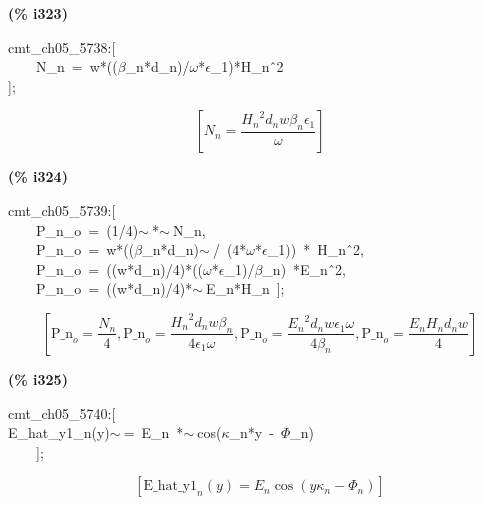 \documentclass[fleqn]{article}
\begin{document}
\noindent
\begin{minipage}[t]{4.000000em}\color{red}\bfseries
(\% i323)	
\end{minipage}
\begin{minipage}[t]{\textwidth}\color{blue}
cmt\_ch05\_5738:[\\
\ \ \ \ N\_n\ =\ w*((\ensuremath{\beta}\_n*d\_n)/\ensuremath{\omega}*\ensuremath{\epsilon}\_1)*H\_n\^\ 2\\
];
\end{minipage}
\[\displaystyle \tag{\% o323} 
\left[ {N_n}=\frac{{{{H_n}}^{2}} {d_n} w {{\beta }_n} {{\epsilon }_1}}{\omega }\right] \mbox{}
\]


\noindent
\begin{minipage}[t]{4.000000em}\color{red}\bfseries
(\% i324)	
\end{minipage}
\begin{minipage}[t]{\textwidth}\color{blue}
cmt\_ch05\_5739:[\\
\ \ \ \ P\_n\_o\ =\ (1/4)\ensuremath{\sim\ }*\ensuremath{\sim\ }N\_n,\\
\ \ \ \ P\_n\_o\ =\ w*((\ensuremath{\beta}\_n*d\_n)\ensuremath{\sim\ }/\ (4*\ensuremath{\omega}*\ensuremath{\epsilon}\_1))\ *\ H\_n\^\ 2,\\
\ \ \ \ P\_n\_o\ =\ ((w*d\_n)/4)*((\ensuremath{\omega}*\ensuremath{\epsilon}\_1)/\ensuremath{\beta}\_n)\ *E\_n\^\ 2,\\
\ \ \ \ P\_n\_o\ =\ ((w*d\_n)/4)*\ensuremath{\sim\ }E\_n*H\_n\ ];
\end{minipage}
\[\displaystyle \tag{\% o324} 
\left[ {{\ensuremath{\mathrm{P\_ n}}}_o}=\frac{{N_n}}{4}\operatorname{,}{{\ensuremath{\mathrm{P\_ n}}}_o}=\frac{{{{H_n}}^{2}} {d_n} w {{\beta }_n}}{4 {{\epsilon }_1} \omega }\operatorname{,}{{\ensuremath{\mathrm{P\_ n}}}_o}=\frac{{{{E_n}}^{2}} {d_n} w {{\epsilon }_1} \omega }{4 {{\beta }_n}}\operatorname{,}{{\ensuremath{\mathrm{P\_ n}}}_o}=\frac{{E_n} {H_n} {d_n} w}{4}\right] \mbox{}
\]


\noindent
\begin{minipage}[t]{4.000000em}\color{red}\bfseries
(\% i325)	
\end{minipage}
\begin{minipage}[t]{\textwidth}\color{blue}
cmt\_ch05\_5740:[\\
E\_hat\_y1\_n(y)\ensuremath{\sim\ }=\ E\_n\ *\ensuremath{\sim\ }cos(\ensuremath{\kappa}\_n*y\ -\ \ensuremath{\Phi}\_n)\\
\ \ \ \ ];
\end{minipage}
\[\displaystyle \tag{\% o325} 
\left[ {{\ensuremath{\mathrm{E\_ hat\_ y1}}}_n}(y)={E_n} \cos{\left( y {{\kappa }_n}-{{\Phi }_n}\right) }\right] \mbox{}
\]
\end{document}
